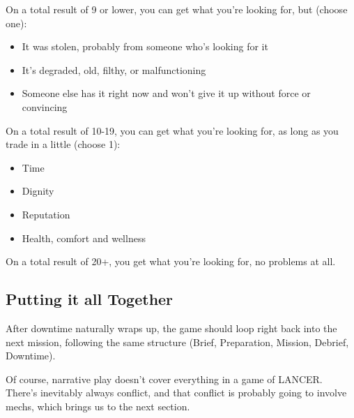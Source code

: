 On a total result of 9 or lower, you can get what you're looking for, but (choose one):
\begin{itemize}
\item It was stolen, probably from someone who's looking for it
\item It's degraded, old, filthy, or malfunctioning
\item Someone else has it right now and won't give it up without force or convincing
\end{itemize}  
On a total result of 10-19, you can get what you're looking for, as long as you trade in a little (choose 1):
\begin{itemize}
\item Time
\item Dignity
\item Reputation
\item Health, comfort and wellness
\end{itemize}  
On a total result of 20+, you get what you're looking for, no problems at all.

\subsection{Putting it all Together}

After downtime naturally wraps up, the game should loop right back into the next mission, following the same structure (Brief, Preparation, Mission, Debrief, Downtime).

Of course, narrative play doesn't cover everything in a game of LANCER. There's inevitably always conflict, and that conflict is probably going to involve mechs, which brings us to the next section.
